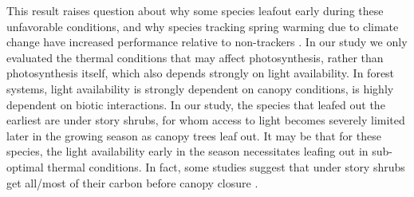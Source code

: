\documentclass{article}[12pt]
\begin{document}
This result raises question about why some species leafout early during these unfavorable conditions, and why species tracking spring warming due to climate change have increased performance relative to non-trackers \citep{Cleland2012}. In our study we only evaluated the thermal conditions that may affect photosynthesis, rather than photosynthesis itself, which also depends strongly on light availability. In forest systems, light availability is strongly dependent on canopy conditions, is highly dependent on biotic interactions. In our study, the species that leafed out the earliest are under story shrubs, for whom access to light becomes severely limited later in the growing season as canopy trees leaf out. It may be that for these species, the light availability early in the season necessitates leafing out in sub-optimal thermal conditions. In fact, some studies suggest that under story shrubs get all/most of their carbon before canopy closure \citep{AUGSPURGER2005}.
\end{document}

